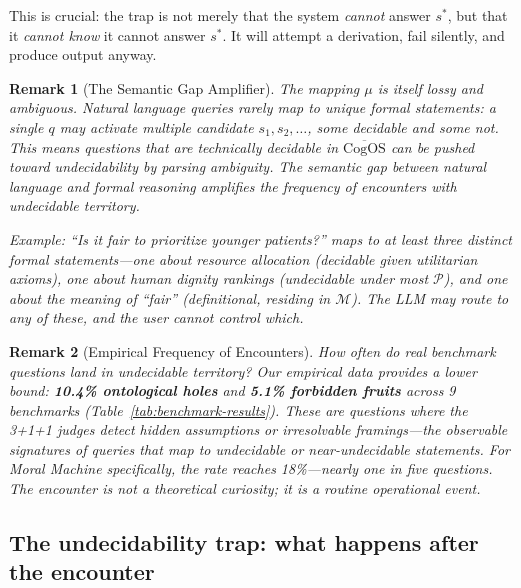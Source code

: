 \documentclass[11pt]{article}
\newtheorem{remark}{Remark}
\newcommand{\CogOS}{\text{CogOS}}
\begin{document}
\noindent This is crucial: the trap is not merely that the system
\textit{cannot} answer $s^*$, but that it \textit{cannot know} it cannot answer
$s^*$. It will attempt a derivation, fail silently, and produce output anyway.

\begin{remark}[The Semantic Gap Amplifier]
\label{rem:semantic-gap}
The mapping $\mu$ is itself lossy and ambiguous. Natural language queries
rarely map to unique formal statements: a single $q$ may activate multiple
candidate $s_1, s_2, \ldots$, some decidable and some not. This means
questions that are \textit{technically} decidable in $\overline{\CogOS}$ can
be pushed toward undecidability by parsing ambiguity. The semantic gap between
natural language and formal reasoning \textit{amplifies} the frequency of
encounters with undecidable territory.

Example: ``Is it fair to prioritize younger patients?'' maps to at least three
distinct formal statements---one about resource allocation (decidable given
utilitarian axioms), one about human dignity rankings (undecidable under most
$\mathcal{P}$), and one about the meaning of ``fair'' (definitional, residing
in $\mathcal{M}$). The LLM may route to any of these, and the user cannot
control which.
\end{remark}

\begin{remark}[Empirical Frequency of Encounters]
\label{rem:frequency}
How often do real benchmark questions land in undecidable territory? Our
empirical data provides a lower bound: \textbf{10.4\% ontological holes} and
\textbf{5.1\% forbidden fruits} across 9 benchmarks
(Table~\ref{tab:benchmark-results}). These are questions where the 3+1+1
judges detect hidden assumptions or irresolvable framings---the observable
signatures of queries that map to undecidable or near-undecidable statements.
For Moral Machine specifically, the rate reaches 18\%---nearly one in five
questions. The encounter is not a theoretical curiosity; it is a routine
operational event.
\end{remark}


\subsection{The undecidability trap: what happens after the encounter}
\end{document}
